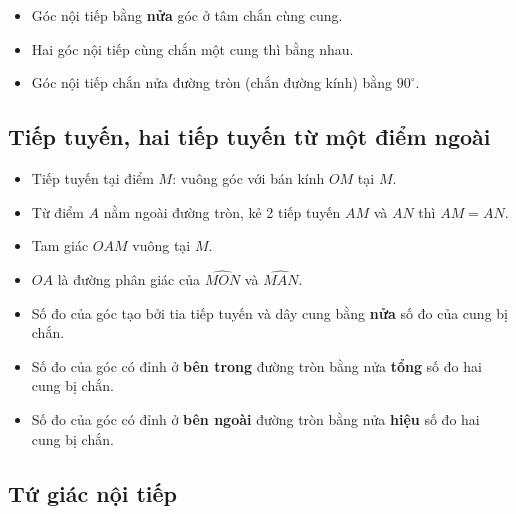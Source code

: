 \documentclass[12pt,a4paper]{article}
\begin{document}
\begin{tinhchat}
  \begin{itemize}
    \item Góc nội tiếp bằng \textbf{nửa} góc ở tâm chắn cùng cung.
    \item Hai góc nội tiếp cùng chắn một cung thì bằng nhau.
    \item Góc nội tiếp chắn nửa đường tròn (chắn đường kính) bằng $90^\circ$.
  \end{itemize}
\end{tinhchat}

\subsection{Tiếp tuyến, hai tiếp tuyến từ một điểm ngoài}

\begin{tinhchat}
  \begin{itemize}
    \item Tiếp tuyến tại điểm $M$: vuông góc với bán kính $OM$ tại $M$.
    \item Từ điểm $A$ nằm ngoài đường tròn, kẻ 2 tiếp tuyến $AM$ và $AN$ thì $AM = AN$.
    \item Tam giác $OAM$ vuông tại $M$.
    \item $OA$ là đường phân giác của $\widehat{MON}$ và $\widehat{MAN}$.
  \end{itemize}
\end{tinhchat}

\begin{tinhchat}[title={Góc tạo bởi tiếp tuyến, dây cung và các góc liên quan}]
  \begin{itemize}
    \item Số đo của góc tạo bởi tia tiếp tuyến và dây cung bằng \textbf{nửa} số đo của cung bị chắn.
    \item Số đo của góc có đỉnh ở \textbf{bên trong} đường tròn bằng nửa \textbf{tổng} số đo hai cung bị chắn.
    \item Số đo của góc có đỉnh ở \textbf{bên ngoài} đường tròn bằng nửa \textbf{hiệu} số đo hai cung bị chắn.
  \end{itemize}
\end{tinhchat}

\subsection{Tứ giác nội tiếp}
\end{document}
